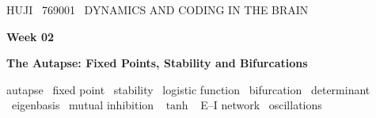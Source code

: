 
\renewcommand{\headleft}{769001 \textperiodcentered\ WEEK 02}
\renewcommand{\headright}{DYNAMICS AND CODING IN THE BRAIN}

\newcommand{\figcap}[1]{\par\smallskip{\small\color{muted}#1}\par}
\newcommand{\hext}{h^{\text{ext}}}
\newcommand{\dr}{\delta r}
\newcommand{\Diag}{\operatorname{Diag}}
\newcommand{\parttitle}[2]{%
  \clearpage
  {\ttfamily\small\color{pgreen}#1}\par\vspace{2pt}
  {\sffamily\bfseries\fontsize{26}{30}\selectfont\color{pgold}#2}\par
  \vspace{4pt}{\color{border}\rule{\linewidth}{1.8pt}}\par\vspace{0.6em}%
  \addtocontents{toc}{\protect\tocpart{#1}}}
\newcommand{\tocpart}[1]{\par\smallskip{\ttfamily\scriptsize\color{pgreen}#1}\par}

\graphicspath{{figures/week02/}}



{\ttfamily\small\color{pgreen}HUJI \textperiodcentered\ 769001 \textperiodcentered\ DYNAMICS AND CODING IN THE BRAIN}\par\vspace{6pt}
{\sffamily\bfseries\fontsize{30}{34}\selectfont\color{pgold}Week 02}\par\vspace{4pt}
{\sffamily\bfseries\Large\color{pgold}The Autapse: Fixed Points, Stability and Bifurcations}\par\vspace{4pt}
{\ttfamily\small\color{pcyan}autapse \textperiodcentered\ fixed point \textperiodcentered\ stability \textperiodcentered\ logistic function \textperiodcentered\ bifurcation \textperiodcentered\ determinant \textperiodcentered\ eigenbasis \textperiodcentered\ mutual inhibition \textperiodcentered\ $\tanh$ \textperiodcentered\ E--I network \textperiodcentered\ oscillations}\par
\vspace{0.8em}

